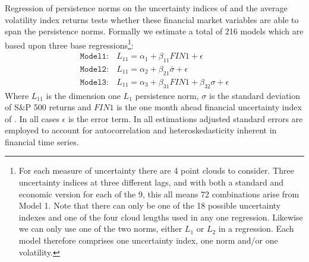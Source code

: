 \documentclass{article}
\begin{document}
Regression of persistence norms on the uncertainty indices of \cite{jurado2015measuring} and the average volatility index returns tests whether these financial market variables are able to span the persistence norms. Formally we estimate a total of 216 models which are based upon three base regressions\footnote{For each measure of uncertainty there are 4 point clouds to consider. Three uncertainty indices at three different lags, and with both a standard and economic version for each of the 9, this all means 72 combinations arise from Model 1. Note that there can only be one of the 18 possible uncertainty indexes and one of the four cloud lengths used in any one regression. Likewise we can only use one of the two norms, either $L_1$ or $L_2$ in a regression. Each model therefore comprises one uncertainty index, one norm and/or one volatility.}: 
\begin{align}
    \mathtt{Model 1:} & L_{11} = \alpha_1 + \beta_{11}FIN1 + \epsilon \\
    \mathtt{Model 2:} & L_{11} = \alpha_2 + \beta_{21}\bar{\sigma} + \epsilon \\
    \mathtt{Model 3:} & L_{11} = \alpha_3 + \beta_{31}FIN1 + \beta_{32}\sigma + \epsilon 
\end{align}
Where $L_{11}$ is the dimension one $L_1$ persistence norm, $\sigma$ is the standard deviation of S\&P 500 returns and $FIN1$ is the one month ahead financial uncertainty index of \cite{jurado2015measuring}. In all cases $\epsilon$ is the error term. In all estimations \cite{newey1987simple} adjusted standard errors are employed to account for autocorrelation and heteroskedasticity inherent in financial time series. 
\end{document}
